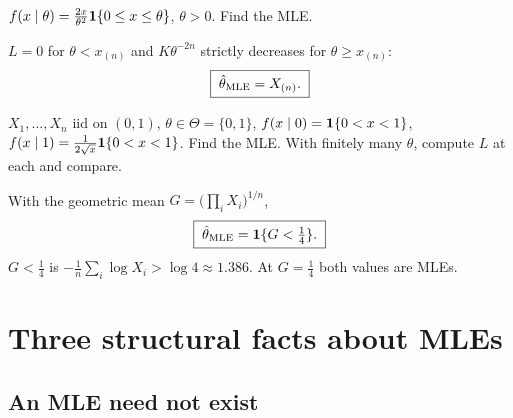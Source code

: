 \begin{example}
$f(x\mid\theta)=\frac{2x}{\theta^2}\mathbf{1}\{0\le x\le\theta\}$, $\theta>0$. Find the MLE.
\begin{deriv}
\end{deriv}
$L=0$ for $\theta<x_{(n)}$ and $K\theta^{-2n}$ strictly decreases for $\theta\ge x_{(n)}$:
\[
  \boxed{\;\hat\theta_{\mathrm{MLE}}=X_{(n)}.\;}
\]
\end{example}

\begin{example}
$X_1,\dots,X_n$ iid on $(0,1)$, $\theta\in\Theta=\{0,1\}$, $f(x\mid0)=\mathbf{1}\{0<x<1\}$, $f(x\mid1)=\frac{1}{2\sqrt x}\mathbf{1}\{0<x<1\}$. Find the MLE. With finitely many $\theta$, compute $L$ at each and compare.
\begin{deriv}
\end{deriv}
With the geometric mean $G=\big(\prod_iX_i\big)^{1/n}$,
\[
  \boxed{\;\hat\theta_{\mathrm{MLE}}=\mathbf{1}\{G<\tfrac14\}.\;}
\]
$G<\frac14$ is $-\frac1n\sum_i\log X_i>\log4\approx1.386$. At $G=\frac14$ both values are MLEs.
\end{example}

\section{Three structural facts about MLEs}

\subsection*{An MLE need not exist}

